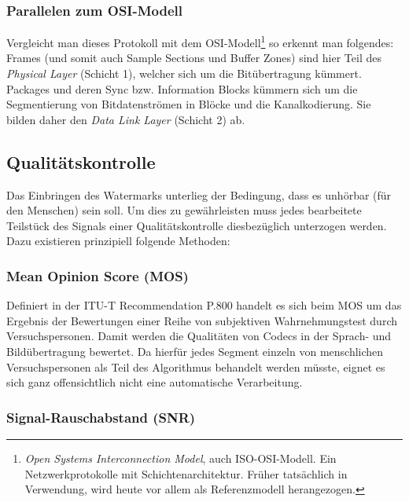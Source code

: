 \subsubsection{Parallelen zum OSI-Modell}

Vergleicht man dieses Protokoll mit dem OSI-Modell\footnote{\textit{Open Systems Interconnection Model}, auch ISO-OSI-Modell. Ein Netzwerkprotokolle mit Schichtenarchitektur. Früher tatsächlich in Verwendung, wird heute vor allem als Referenzmodell herangezogen.} so erkennt man folgendes: Frames (und somit auch Sample Sections und Buffer Zones) sind hier Teil des \textit{Physical Layer} (Schicht 1), welcher sich um die Bitübertragung kümmert. Packages und deren Sync bzw. Information Blocks kümmern sich um  die Segmentierung von Bitdatenströmen in Blöcke und die Kanalkodierung. Sie bilden daher den \textit{Data Link Layer} (Schicht 2) ab.
 
\subsection{Qualitätskontrolle}
\label{sec:qualitaetskontrolle}

Das Einbringen des Watermarks unterlieg der Bedingung, dass es unhörbar (für den Menschen) sein soll. Um dies zu gewährleisten muss jedes bearbeitete Teilstück des Signals einer Qualitätskontrolle diesbezüglich unterzogen werden. Dazu existieren prinzipiell folgende Methoden:

\subsubsection{Mean Opinion Score (MOS)}

Definiert in der ITU-T Recommendation P.800\cite{rec1996p} handelt es sich beim MOS um das Ergebnis der Bewertungen einer Reihe von subjektiven Wahrnehmungstest durch Versuchspersonen. Damit werden die Qualitäten von Codecs in der Sprach- und Bildübertragung bewertet. Da hierfür jedes Segment einzeln von menschlichen Versuchspersonen als Teil des Algorithmus behandelt werden müsste, eignet es sich ganz offensichtlich nicht eine automatische Verarbeitung. 

\subsubsection{Signal-Rauschabstand (SNR)} 

